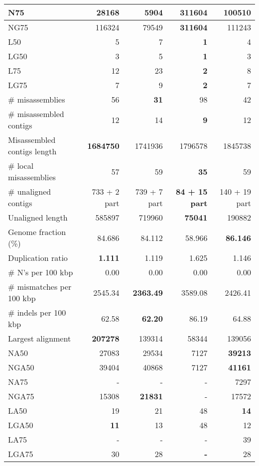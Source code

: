 \documentclass[12pt,a4paper]{article}
\begin{document}
\begin{table}[ht]
\begin{center}
\begin{tabular}{|l*{4}{|r}|}
N75 & 28168 & 5904 & {\bf 311604} & 100510 \\ \hline
NG75 & 116324 & 79549 & {\bf 311604} & 111243 \\ \hline
L50 & 5 & 7 & {\bf 1} & 4 \\ \hline
LG50 & 3 & 5 & {\bf 1} & 3 \\ \hline
L75 & 12 & 23 & {\bf 2} & 8 \\ \hline
LG75 & 7 & 9 & {\bf 2} & 7 \\ \hline
\# misassemblies & 56 & {\bf 31} & 98 & 42 \\ \hline
\# misassembled contigs & 12 & 14 & {\bf 9} & 12 \\ \hline
Misassembled contigs length & {\bf 1684750} & 1741936 & 1796578 & 1845738 \\ \hline
\# local misassemblies & 57 & 59 & {\bf 35} & 59 \\ \hline
\# unaligned contigs & 733 + 2 part & 739 + 7 part & {\bf 84 + 15 part} & 140 + 19 part \\ \hline
Unaligned length & 585897 & 719960 & {\bf 75041} & 190882 \\ \hline
Genome fraction (\%) & 84.686 & 84.112 & 58.966 & {\bf 86.146} \\ \hline
Duplication ratio & {\bf 1.111} & 1.119 & 1.625 & 1.146 \\ \hline
\# N's per 100 kbp & 0.00 & 0.00 & 0.00 & 0.00 \\ \hline
\# mismatches per 100 kbp & 2545.34 & {\bf 2363.49} & 3589.08 & 2426.41 \\ \hline
\# indels per 100 kbp & 62.58 & {\bf 62.20} & 86.19 & 64.88 \\ \hline
Largest alignment & {\bf 207278} & 139314 & 58344 & 139056 \\ \hline
NA50 & 27083 & 29534 & 7127 & {\bf 39213} \\ \hline
NGA50 & 39404 & 40868 & 7127 & {\bf 41161} \\ \hline
NA75 & - & - & - & 7297 \\ \hline
NGA75 & 15308 & {\bf 21831} & - & 17572 \\ \hline
LA50 & 19 & 21 & 48 & {\bf 14} \\ \hline
LGA50 & {\bf 11} & 13 & 48 & 12 \\ \hline
LA75 & - & - & - & 39 \\ \hline
LGA75 & 30 & 28 & {\bf -} & 28 \\ \hline
\end{tabular}
\end{center}
\end{table}
\end{document}
